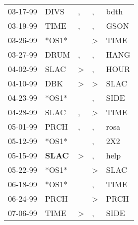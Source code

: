 \begin{supertabular}{p{0.07\textwidth}p{0.06\textwidth}p{0.02\textwidth}p{0.02\textwidth}p{0.06\textwidth}}
 03-17-99\textsuperscript{} &           DIVS\textsuperscript{} &                , &             , &          bdth\textsuperscript{} \\
 03-19-99\textsuperscript{} &           TIME\textsuperscript{} &                , &             , &          GSON\textsuperscript{} \\
 03-26-99\textsuperscript{} &                            *OS1* &                  &  \textgreater &          TIME\textsuperscript{} \\
 03-27-99\textsuperscript{} &           DRUM\textsuperscript{} &                , &             , &          HANG\textsuperscript{} \\
 04-02-99\textsuperscript{} &           SLAC\textsuperscript{} &     \textgreater &             , &          HOUR\textsuperscript{} \\
 04-10-99\textsuperscript{} &            DBK\textsuperscript{} &     \textgreater &  \textgreater &          SLAC\textsuperscript{} \\
 04-23-99\textsuperscript{} &                            *OS1* &                  &             , &          SIDE\textsuperscript{} \\
 04-28-99\textsuperscript{} &           SLAC\textsuperscript{} &                , &  \textgreater &          TIME\textsuperscript{} \\
 05-01-99\textsuperscript{} &           PRCH\textsuperscript{} &                , &             , &          rosa\textsuperscript{} \\
 05-12-99\textsuperscript{} &                            *OS1* &                  &             , &           2X2\textsuperscript{} \\
 05-15-99\textsuperscript{} &  \textbf{SLAC\textsuperscript{}} &     \textgreater &             , &          help\textsuperscript{} \\
 05-22-99\textsuperscript{} &                            *OS1* &                  &  \textgreater &          SLAC\textsuperscript{} \\
 06-18-99\textsuperscript{} &                            *OS1* &                  &             , &          TIME\textsuperscript{} \\
 06-24-99\textsuperscript{} &           PRCH\textsuperscript{} &                  &  \textgreater &          PRCH\textsuperscript{} \\
 07-06-99\textsuperscript{} &           TIME\textsuperscript{} &     \textgreater &             , &          SIDE\textsuperscript{} \\

\end{supertabular}
